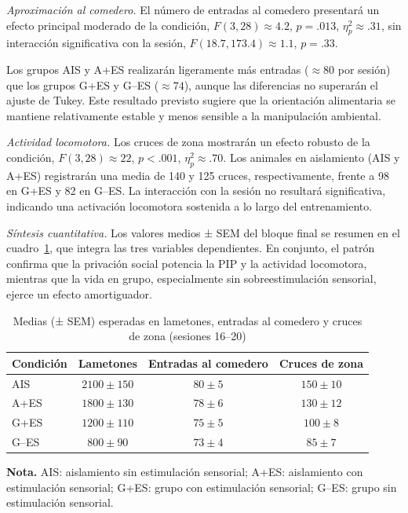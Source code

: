 \documentclass[12pt,a4paper]{article}
\begin{document}
\begin{multicols}{2}
\textit{Aproximación al comedero.} El número de entradas al comedero presentará un efecto principal moderado de la condición, $F(3, 28) \approx 4.2$, $p = .013$, $\eta^2_p \approx .31$, sin interacción significativa con la sesión, $F(18.7, 173.4) \approx 1.1$, $p = .33$.

Los grupos AIS y A+ES realizarán ligeramente más entradas ($\approx 80$ por sesión) que los grupos G+ES y G--ES ($\approx 74$), aunque las diferencias no superarán el ajuste de Tukey. Este resultado previsto sugiere que la orientación alimentaria se mantiene relativamente estable y menos sensible a la manipulación ambiental.

\textit{Actividad locomotora.} Los cruces de zona mostrarán un efecto robusto de la condición, $F(3, 28) \approx 22$, $p < .001$, $\eta^2_p \approx .70$. Los animales en aislamiento (AIS y A+ES) registrarán una media de 140 y 125 cruces, respectivamente, frente a 98 en G+ES y 82 en G--ES. La interacción con la sesión no resultará significativa, indicando una activación locomotora sostenida a lo largo del entrenamiento.

\textit{Síntesis cuantitativa.} Los valores medios ± SEM del bloque final se resumen en el cuadro~\ref{tab:tabla1}, que integra las tres variables dependientes. En conjunto, el patrón confirma que la privación social potencia la PIP y la actividad locomotora, mientras que la vida en grupo, especialmente sin sobreestimulación sensorial, ejerce un efecto amortiguador.

\begin{table}[t]
    \centering
    \caption{Medias (± SEM) esperadas en lametones, entradas al comedero y cruces de zona (sesiones 16--20)}
    \label{tab:tabla1}
    \begin{tabular}{lccc}
    \toprule
    \textbf{Condición} & \textbf{Lametones} & \textbf{Entradas al comedero} & \textbf{Cruces de zona} \\
    \midrule
    AIS   & $2100 \pm 150$ & $80 \pm 5$ & $150 \pm 10$ \\
    A+ES  & $1800 \pm 130$ & $78 \pm 6$ & $130 \pm 12$ \\
    G+ES  & $1200 \pm 110$ & $75 \pm 5$ & $100 \pm 8$ \\
    G--ES & $800 \pm 90$   & $73 \pm 4$ & $85 \pm 7$ \\
    \bottomrule
    \end{tabular}
    
    \vspace{1mm}
    \parbox{\textwidth}{\small \textbf{Nota.} AIS: aislamiento sin estimulación sensorial; A+ES: aislamiento con estimulación sensorial; G+ES: grupo con estimulación sensorial; G--ES: grupo sin estimulación sensorial.}
\end{table}



\end{multicols}
\end{document}
